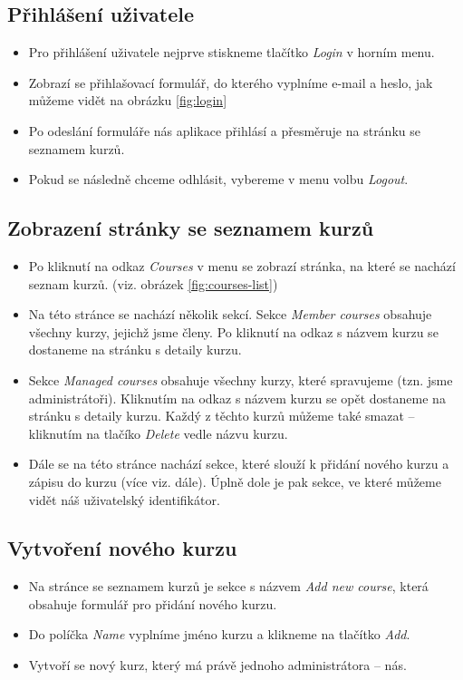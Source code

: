 \subsection{Přihlášení uživatele}

\begin{itemize}
	\item Pro přihlášení uživatele nejprve stiskneme tlačítko \textit{Login} v horním menu.
	\item Zobrazí se přihlašovací formulář, do kterého vyplníme e-mail a heslo, jak můžeme vidět na obrázku \ref{fig:login}
	\item Po odeslání formuláře nás aplikace přihlásí a přesměruje na stránku se seznamem kurzů.
	\item Pokud se následně chceme odhlásit, vybereme v menu volbu \textit{Logout}.
\end{itemize}

\subsection{Zobrazení stránky se seznamem kurzů}

\begin{itemize}
	\item Po kliknutí na odkaz \textit{Courses} v menu se zobrazí stránka, na které se nachází seznam kurzů. (viz. obrázek \ref{fig:courses-list})
	\item Na této stránce se nachází několik sekcí. Sekce \textit{Member courses} obsahuje všechny kurzy, jejichž jsme členy. Po kliknutí na odkaz s názvem kurzu se dostaneme na stránku s detaily kurzu.
	\item Sekce \textit{Managed courses} obsahuje všechny kurzy, které spravujeme (tzn. jsme administrátoři). Kliknutím na odkaz s názvem kurzu se opět dostaneme na stránku s detaily kurzu. Každý z těchto kurzů můžeme také smazat -- kliknutím na tlačíko \textit{Delete} vedle názvu kurzu.
	\item Dále se na této stránce nachází sekce, které slouží k přidání nového kurzu a zápisu do kurzu (více viz. dále). Úplně dole je pak sekce, ve které můžeme vidět náš uživatelský identifikátor.
\end{itemize}

\subsection{Vytvoření nového kurzu}

\begin{itemize}
	\item Na stránce se seznamem kurzů je sekce s názvem \textit{Add new course}, která obsahuje formulář pro přidání nového kurzu.
	\item Do políčka \textit{Name} vyplníme jméno kurzu a klikneme na tlačítko \textit{Add}.
	\item Vytvoří se nový kurz, který má právě jednoho administrátora -- nás.
\end{itemize}

